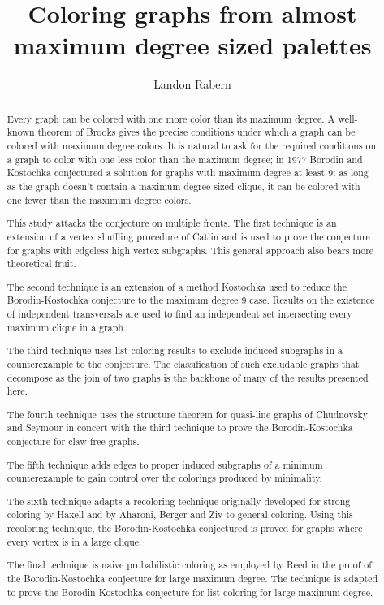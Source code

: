 \documentclass[12pt]{article}
\title{Coloring graphs from almost maximum degree sized palettes}
\author{Landon Rabern}
\date{}
\theoremstyle{plain}
\theoremstyle{definition}
\theoremstyle{remark}
\begin{document}
\maketitle
\begin{abstract}
Every graph can be colored with one more color than its maximum degree. A
well-known theorem of Brooks gives the precise conditions under which a graph
can be colored with maximum degree colors.  It is natural to ask for the
required conditions on a graph to color with one less color than the maximum
degree; in 1977 Borodin and Kostochka conjectured a solution for graphs with maximum degree at least 9: as long as the graph doesn't contain a maximum-degree-sized clique, it can be colored with one
fewer than the maximum degree colors.

This study attacks the conjecture on multiple fronts.  The first technique is an
extension of a vertex shuffling procedure of Catlin and is used to prove the
conjecture for graphs with edgeless high vertex subgraphs.  This general
approach also bears more theoretical fruit.

The second technique is an extension of a method Kostochka used to reduce the
Borodin-Kostochka conjecture to the maximum degree 9 case.  Results on the
existence of independent transversals are used to find an independent set
intersecting every maximum clique in a graph.  

The third technique uses list coloring results to exclude induced subgraphs in a
counterexample to the conjecture. The classification of such excludable graphs
that decompose as the join of two graphs is the backbone of
many of the results presented here.

The fourth technique uses the structure theorem for quasi-line graphs of 
Chudnovsky and Seymour in concert with the third technique to prove the
Borodin-Kostochka conjecture for claw-free graphs.

The fifth technique adds edges to proper induced subgraphs of a minimum
counterexample to gain control over the colorings produced by minimality.

The sixth technique adapts a recoloring technique originally developed for
strong coloring by Haxell and by Aharoni, Berger and Ziv to general coloring. 
Using this recoloring technique, the Borodin-Kostochka conjectured is proved for
graphs where every vertex is in a large clique.

The final technique is naive probabilistic coloring as employed by
Reed in the proof of the Borodin-Kostochka conjecture for large maximum degree. 
The technique is adapted to prove the Borodin-Kostochka conjecture for list
coloring for large maximum degree.
\end{abstract}
\end{document}
